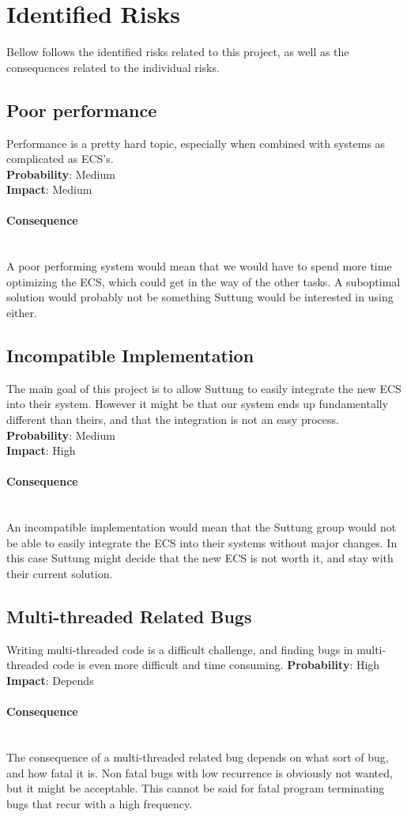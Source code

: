 \newcommand{\ptparagraph}[1]{\paragraph{#1}\mbox{}\\}
\newcommand{\ptsubparagraph}[1]{\mbox{}\\\textbf{#1}\mbox{}\\}

\section*{Identified Risks}
Bellow follows the identified risks related to this project, 
as well as the consequences related to the individual risks.

\subsection*{Poor performance}
Performance is a pretty hard topic, especially when combined with
systems as complicated as ECS's.\\
\textbf{Probability}: Medium\\
\textbf{Impact}: Medium

\ptparagraph{Consequence}
A poor performing system would mean that we would have to spend more time
optimizing the ECS, which could get in the way of the other tasks.
A suboptimal solution would probably not be something Suttung would be interested
in using either.

\subsection*{Incompatible Implementation}
The main goal of this project is to allow Suttung to easily integrate the new ECS
into their system. 
However it might be that our system ends up fundamentally different than theirs,
and that the integration is not an easy process.
\textbf{Probability}: Medium\\
\textbf{Impact}: High

\ptparagraph{Consequence} 
An incompatible implementation would mean that the Suttung group would not be able to
easily integrate the ECS into their systems without major changes. 
In this case Suttung might decide that the new ECS is not worth it,
and stay with their current solution.

\subsection*{Multi-threaded Related Bugs}
Writing multi-threaded code is a difficult challenge, and finding bugs in multi-threaded
code is even more difficult and time consuming.
\textbf{Probability}: High\\
\textbf{Impact}: Depends

\ptparagraph{Consequence}
The consequence of a multi-threaded related bug depends on what sort of bug, 
and how fatal it is. Non fatal bugs with low recurrence is obviously not wanted,
but it might be acceptable. This cannot be said for fatal program terminating bugs
that recur with a high frequency.